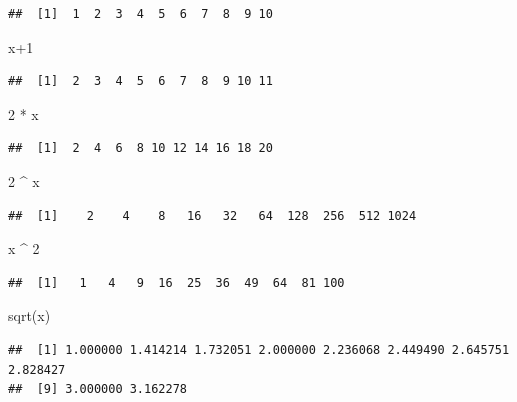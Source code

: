 \documentclass[
]{book}
\newenvironment{Shaded}{\begin{snugshade}}{\end{snugshade}}
\newcommand{\DecValTok}[1]{\textcolor[rgb]{0.00,0.00,0.81}{#1}}
\newcommand{\FunctionTok}[1]{\textcolor[rgb]{0.00,0.00,0.00}{#1}}
\newcommand{\NormalTok}[1]{#1}
\newcommand{\SpecialCharTok}[1]{\textcolor[rgb]{0.00,0.00,0.00}{#1}}
\begin{document}
\begin{verbatim}
##  [1]  1  2  3  4  5  6  7  8  9 10
\end{verbatim}

\begin{Shaded}
\begin{Highlighting}[]
\NormalTok{x}\SpecialCharTok{+}\DecValTok{1}
\end{Highlighting}
\end{Shaded}

\begin{verbatim}
##  [1]  2  3  4  5  6  7  8  9 10 11
\end{verbatim}

\begin{Shaded}
\begin{Highlighting}[]
\DecValTok{2} \SpecialCharTok{*}\NormalTok{ x}
\end{Highlighting}
\end{Shaded}

\begin{verbatim}
##  [1]  2  4  6  8 10 12 14 16 18 20
\end{verbatim}

\begin{Shaded}
\begin{Highlighting}[]
\DecValTok{2} \SpecialCharTok{\^{}}\NormalTok{ x}
\end{Highlighting}
\end{Shaded}

\begin{verbatim}
##  [1]    2    4    8   16   32   64  128  256  512 1024
\end{verbatim}

\begin{Shaded}
\begin{Highlighting}[]
\NormalTok{x }\SpecialCharTok{\^{}} \DecValTok{2}
\end{Highlighting}
\end{Shaded}

\begin{verbatim}
##  [1]   1   4   9  16  25  36  49  64  81 100
\end{verbatim}

\begin{Shaded}
\begin{Highlighting}[]
\FunctionTok{sqrt}\NormalTok{(x)}
\end{Highlighting}
\end{Shaded}

\begin{verbatim}
##  [1] 1.000000 1.414214 1.732051 2.000000 2.236068 2.449490 2.645751 2.828427
##  [9] 3.000000 3.162278
\end{verbatim}
\end{document}
